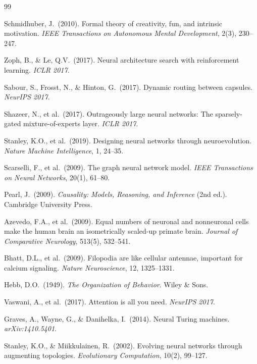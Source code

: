 \documentclass[12pt]{article}
\begin{document}
\begin{thebibliography}{99}

 Schmidhuber, J.\ (2010). Formal theory of creativity, fun, and intrinsic motivation. \textit{IEEE Transactions on Autonomous Mental Development}, 2(3), 230--247.

 Zoph, B., \& Le, Q.V.\ (2017). Neural architecture search with reinforcement learning. \textit{ICLR 2017}.

 Sabour, S., Frosst, N., \& Hinton, G.\ (2017). Dynamic routing between capsules. \textit{NeurIPS 2017}.

 Shazeer, N., et al.\ (2017). Outrageously large neural networks: The sparsely-gated mixture-of-experts layer. \textit{ICLR 2017}.

 Stanley, K.O., et al.\ (2019). Designing neural networks through neuroevolution. \textit{Nature Machine Intelligence}, 1, 24--35.

 Scarselli, F., et al.\ (2009). The graph neural network model. \textit{IEEE Transactions on Neural Networks}, 20(1), 61--80.

 Pearl, J.\ (2009). \textit{Causality: Models, Reasoning, and Inference} (2nd ed.). Cambridge University Press.

 Azevedo, F.A., et al.\ (2009). Equal numbers of neuronal and nonneuronal cells make the human brain an isometrically scaled-up primate brain. \textit{Journal of Comparative Neurology}, 513(5), 532--541.

 Bhatt, D.L., et al.\ (2009). Filopodia are like cellular antennae, important for calcium signaling. \textit{Nature Neuroscience}, 12, 1325--1331.

 Hebb, D.O.\ (1949). \textit{The Organization of Behavior}. Wiley \& Sons.

 Vaswani, A., et al.\ (2017). Attention is all you need. \textit{NeurIPS 2017}.

 Graves, A., Wayne, G., \& Danihelka, I.\ (2014). Neural Turing machines. \textit{arXiv:1410.5401}.

 Stanley, K.O., \& Miikkulainen, R.\ (2002). Evolving neural networks through augmenting topologies. \textit{Evolutionary Computation}, 10(2), 99--127.


\end{thebibliography}
\end{document}
